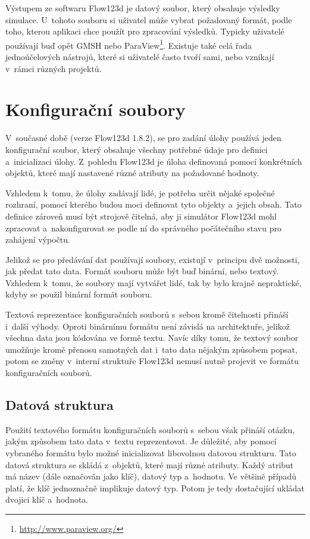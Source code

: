 \documentclass[FM,bw,DP]{tulthesis}
\begin{document}
Výstupem ze softwaru Flow123d je datový soubor, který obsahuje výsledky simulace. U~tohoto souboru si uživatel může vybrat požadovaný formát, podle toho, kterou aplikaci chce použít pro zpracování výsledků. Typicky uživatelé používají buď opět GMSH nebo ParaView\footnote{\url{http://www.paraview.org/}}. Existuje také celá řada jednoúčelových nástrojů, které si uživatelé často tvoří sami, nebo vznikají v~rámci různých projektů.

\section{Konfigurační soubory}

V~současné době (verze Flow123d 1.8.2), se pro zadání úlohy používá jeden konfigurační soubor, který obsahuje všechny potřebné údaje pro definici a~inicializaci úlohy. Z~pohledu Flow123d je úloha definovaná pomocí konkrétních objektů, které mají nastavené různé atributy na požadované hodnoty. 

Vzhledem k~tomu, že úlohy zadávají lidé, je potřeba určit nějaké společné rozhraní, pomocí kterého budou moci definovat tyto objekty a~jejich obsah. Tato definice zároveň musí být strojově čitelná, aby ji simulátor Flow123d mohl zpracovat a~nakonfigurovat se podle ní do správného počátečního stavu pro zahájení výpočtu.

Jelikož se pro předávání dat používají soubory, existují v~principu dvě možnosti, jak předat tato data. Formát souboru může být buď binární, nebo textový. Vzhledem k~tomu, že soubory mají vytvářet lidé, tak by bylo krajně nepraktické, kdyby se použil binární formát souboru.

Textová reprezentace konfiguračních souborů s~sebou kromě čitelnosti přináší i~další výhody. Oproti binárnímu formátu není závislá na architektuře, jelikož všechna data jsou kódována ve formě textu. Navíc díky tomu, že textový soubor umožňuje kromě přenosu samotných dat i~tato data nějakým způsobem popsat, potom se změny v~interní struktuře Flow123d nemusí nutně projevit ve formátu konfiguračních souborů.

\subsection{Datová struktura}
\label{sec:datova-struktura}
Použití textového formátu konfiguračních souborů s~sebou však přináší otázku, jakým způsobem tato data v~textu reprezentovat. Je důležité, aby pomocí vybraného formátu bylo možné inicializovat libovolnou datovou strukturu. Tato datová struktura se skládá z~objektů, které mají různé atributy. Každý atribut má název (dále označován jako klíč), datový typ a~hodnotu. Ve většině případů platí, že klíč jednoznačně implikuje datový typ. Potom je tedy dostačující ukládat dvojici klíč a~hodnota.
\end{document}
